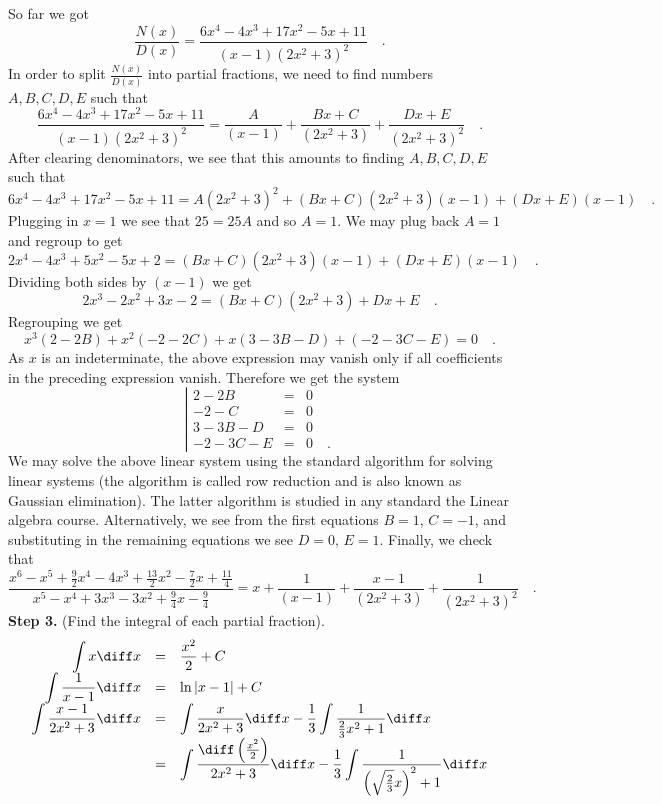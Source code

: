 {So far we got
\[
\frac{N(x)}{D(x)}= \frac{6 x^{4}-4 x^{3}+17 x^{2}-5 x+11}{(x-1)(2x^2+3)^2}\quad .
\]
In order to split $\frac{N(x)}{D(x)}$ into partial fractions, we need to find numbers $A, B, C, D, E$ such that
\[
\frac{6 x^{4}-4 x^{3}+17 x^{2}-5 x+11}{(x-1)(2x^2+3)^2}= \frac{A}{(x-1)}+\frac{Bx+C}{(2x^2+3)}+\frac{Dx+E}{(2x^2+3)^2}\quad .
\]
After clearing denominators, we see that this amounts to finding $A, B, C, D, E$ such that
\[
6 x^{4}-4 x^{3}+17 x^{2}-5 x+11= A(2x^2+3)^2+ (Bx+C)(2x^2+3)(x-1) + (Dx+E)(x-1)\quad .
\]
Plugging in $x=1$ we see that $25=25A $ and so $A=1$. We may plug back $A=1$ and regroup to get
\[
2x^{4}-4x^{3}+5x^{2}-5x+2= (Bx+C)(2x^2+3)(x-1) + (Dx+E)(x-1)\quad .
\]
Dividing both sides by $(x-1)$ we get
\[
2x^{3}-2x^{2}+3x-2= (Bx+C)(2x^2+3)+Dx+E\quad .
\]
Regrouping we get
\[
x^{3}(2- 2B) + x^2(-2-2C)+x(3-3B-D)+(-2-3C-E)=0\quad.
\]
As $x$ is an indeterminate, the above expression may vanish only if all coefficients in the preceding expression vanish. Therefore we get the system
\[
\left| \begin{array}{rcl}
2-2B&=&0\\
-2-C&=&0\\
3-3B-D&=&0\\
-2-3C-E&=&0\quad .
\end{array}   \right.
\]
We may solve the above linear system using the standard algorithm for solving linear systems (the algorithm is called row reduction and is also known as Gaussian elimination). The latter algorithm is studied in any standard the Linear algebra course. Alternatively, we see from the first equations $B=1$, $C=-1$, and substituting in the remaining equations we see $D=0$, $E=1$. Finally, we check that
\[
\frac{x^{6}-x^{5}+\frac{9}{2} x^{4}-4 x^{3}+\frac{13}{2} x^{2}-\frac{7}{2} x+\frac{11}{4}}{x^{5}-x^{4}+3 x^{3}-3 x^{2}+\frac{9}{4} x-\frac{9}{4}}
=x+\frac{1}{(x-1)}+\frac{x-1}{(2x^2+3)}+\frac{1}{(2x^2+3)^2}\quad .
\]
\textbf{Step 3.} (Find the integral of each partial fraction).
\[
\begin{array}{rcl}
\displaystyle\int x \diff x &= &\displaystyle \frac{x ^2}2+C\\
\displaystyle\int \frac{1}{x-1} \diff x &=&\displaystyle  \ln|x-1|+C\\
\displaystyle\int \frac{x-1}{2x^2+3} \diff x &=& \displaystyle \int\frac{x}{2x^2+3}\diff x -\frac{1}{3}\int \frac{1}{\frac23x^2+1}\diff x\\
&=& \displaystyle  \int \frac{\diff\left(\frac{x^2}2\right) }{2x^2+3}\diff x-\frac{1}{3} \int \frac{1}{\left(\sqrt{\frac23}x\right)^2+1} \diff x\\

\end{array}\]}
